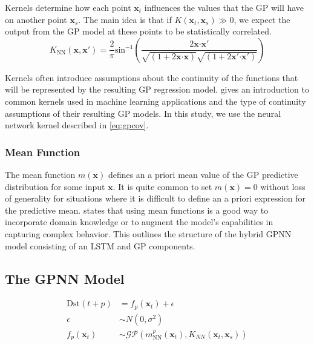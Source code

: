 Kernels determine how each point $\mathbf{x}_t$ influences the values that the GP will have on 
another point $\mathbf{x}_s$. The main idea is that if $K(\mathbf{x}_t, \mathbf{x}_s) \gg 0$, we 
expect the output from the GP model at these points to be statistically correlated. 
%
\begin{equation}\label{eq:gpcov}
	K_{\text{NN}} \left( \mathbf{x}, \mathbf{x}' \right) = 
	\frac{2}{ \pi } \text{sin}^{-1} \left( \frac{2\mathbf{x}\boldsymbol{\cdot}\mathbf{x}'}{
		\sqrt{ \left( 1+2\mathbf{x}\boldsymbol{\cdot} \mathbf{x} \right)}\sqrt{\left( 1+2\mathbf{x}'\boldsymbol{\cdot}\mathbf{x}' \right)}
		} \right)
\end{equation}


Kernels often introduce assumptions about the continuity of the functions that will be 
represented by the resulting GP regression model. \citet[ch.~4]{Rasmussen:2005:GPM:1162254} gives an 
introduction to common kernels used in machine learning applications and the type of continuity assumptions 
of their resulting GP models. In this study, we use the neural network kernel \citep{williams1998computation} 
described in \cref{eq:gpcov}. 

\subsubsection*{Mean Function}

The mean function $m \left( \mathbf{x} \right)$ defines an a priori mean value of the GP predictive distribution for 
some input $\mathbf{x}$. It is quite common to set $m(\mathbf{x}) = 0$ without loss of generality for situations where 
it is difficult to define an a priori expression for the predictive mean. 
\citet[ch.~2,sec.~2.7]{Rasmussen:2005:GPM:1162254} states that using mean functions is a good way to incorporate 
domain knowledge or to augment the model's capabilities in capturing complex behavior. This outlines the structure 
of the hybrid GPNN model consisting of an LSTM and GP components. 

\subsection{The GPNN Model}

\begin{align}
	\mathrm{Dst} \left( t+p \right) &= f_{p} \left( \mathbf{x}_{t} \right) + \epsilon \label{eq:dstgpnn}\\ 
	\epsilon &\sim N \left( 0, \sigma ^{2} \right)  \label{eq:gpnnNoise}\\
	f_{p} \left( \mathbf{x}_{t} \right)  &\sim 
	\mathcal{GP}\left(m^{p}_{\text{NN}}(\mathbf{x}_t), K_{NN}(\mathbf{x}_{t},\mathbf{x}_{s})\right)\label{eq:gpnnGPForm}
\end{align}
	
